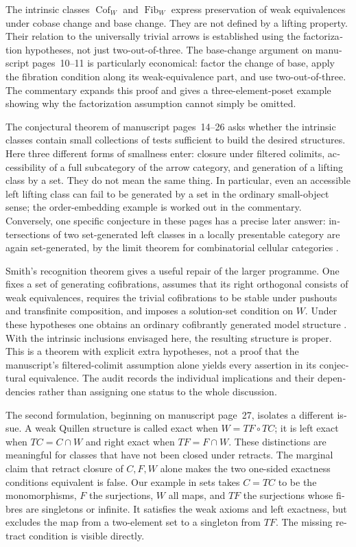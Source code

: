 \begin{otherlanguage}{english}
The intrinsic classes $\operatorname{Cof}_W$ and
$\operatorname{Fib}_W$ express preservation of weak equivalences under
cobase change and base change. They are not defined by a lifting property.
Their relation to the universally trivial arrows is established using the
factorization hypotheses, not just two-out-of-three. The base-change
argument on manuscript pages~10--11 is particularly economical: factor the
change of base, apply the fibration condition along its weak-equivalence
part, and use two-out-of-three. The commentary expands this proof and gives
a three-element-poset example showing why the factorization assumption
cannot simply be omitted.

The conjectural theorem of manuscript pages~14--26 asks whether the
intrinsic classes contain small collections of tests sufficient to build
the desired structures. Here three different forms of smallness enter:
closure under filtered colimits, accessibility of a full subcategory of the
arrow category, and generation of a lifting class by a set. They do not
mean the same thing. In particular, even an accessible left lifting class
can fail to be generated by a set in the ordinary small-object sense; the
order-embedding example is worked out in the commentary. Conversely, one
specific conjecture in these pages has a precise later answer: intersections
of two set-generated left classes in a locally presentable category are
again set-generated, by the limit theorem for combinatorial cellular
categories \citep[Theorem~3.2 and Remark~3.8]{MakkaiRosicky2014Cellular}.

Smith's recognition theorem gives a useful repair of the larger programme.
One fixes a set of generating cofibrations, assumes that its right
orthogonal consists of weak equivalences, requires the trivial cofibrations
to be stable under pushouts and transfinite composition, and imposes a
solution-set condition on $W$. Under these hypotheses one obtains an
ordinary cofibrantly generated model structure
\citep[Theorem~1.7]{Beke2000}. With the intrinsic inclusions envisaged here,
the resulting structure is proper. This is a theorem with explicit extra
hypotheses, not a proof that the manuscript's filtered-colimit assumption
alone yields every assertion in its conjectural equivalence. The audit
records the individual implications and their dependencies rather than
assigning one status to the whole discussion.

The second formulation, beginning on manuscript page~27, isolates a
different issue. A weak Quillen structure is called exact when
$W=TF\circ TC$; it is left exact when $TC=C\cap W$ and right exact when
$TF=F\cap W$. These distinctions are meaningful for classes that have not
been closed under retracts. The marginal claim that retract closure of
$C,F,W$ alone makes the two one-sided exactness conditions equivalent is
false. Our example in sets takes $C=TC$ to be the monomorphisms, $F$ the
surjections, $W$ all maps, and $TF$ the surjections whose fibres are singletons
or infinite. It satisfies the weak axioms and left exactness, but excludes
the map from a two-element set to a singleton from $TF$. The missing
retract condition is visible directly.


\end{otherlanguage}
